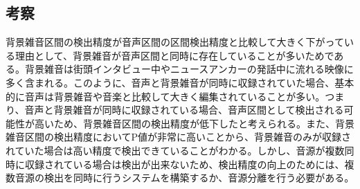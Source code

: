 \begin{comment}
次に、本研究で評価に用いたニュース音声5番組分の発話区間検出精度を表\ref{table:test_detail_RPF}に示す。

\begin{table}[H]
  \begin{center}
    \caption{発話区間検出精度 \label{table:test_detail_RPF}}
    \begin{tabular}{|c||c|c|c|} \hline
      データID & Recall & Precision & F-meature \\ \hline
      ニュース1 & 0.895 & 0.916 & 0.905 \\ \hline
      ニュース2 & 0.841 & 0.955 & 0.895\\ \hline
      ニュース3 & 0.883 & 0.860 & 0.871 \\ \hline
      ニュース4 & 0.901 & 0.833 & 0.866\\ \hline
      ニュース5 & 0.910 & 0.930 & 0.906\\ \hline
    \end{tabular}
  \end{center}
\end{table}

音声区間の検出精度は表\ref{table:NHK_speech_RPF}の結果と同様、高い精度を示した。
\end{comment}

\subsection{考察}
背景雑音区間の検出精度が音声区間の区間検出精度と比較して大きく下がっている理由として、背景雑音が音声区間と同時に存在していることが多いためである。背景雑音は街頭インタビュー中やニュースアンカーの発話中に流れる映像に多く含まれる。このように、音声と背景雑音が同時に収録されていた場合、基本的に音声は背景雑音や音楽と比較して大きく編集されていることが多い。つまり、音声と背景雑音が同時に収録されている場合、音声区間として検出される可能性が高いため、背景雑音区間の検出精度が低下したと考えられる。また、背景雑音区間の検出精度においてP値が非常に高いことから、背景雑音のみが収録されていた場合は高い精度で検出できていることがわかる。しかし、音源が複数同時に収録されている場合は検出が出来ないため、検出精度の向上のためには、複数音源の検出を同時に行うシステムを構築するか、音源分離を行う必要がある。\par
